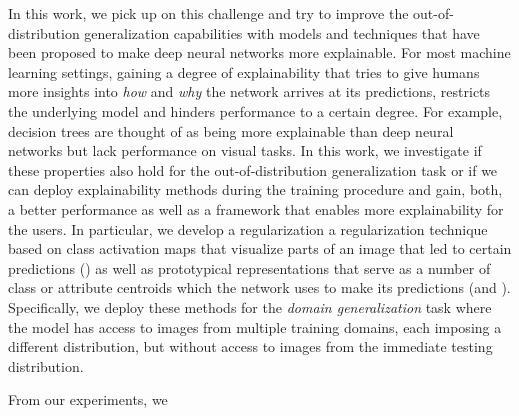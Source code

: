 In this work, we pick up on this challenge and try to improve the out-of-distribution generalization capabilities with models and techniques that have been proposed to make deep neural networks more explainable. For most machine learning settings, gaining a degree of explainability that tries to give humans more insights into \emph{how} and \emph{why} the network arrives at its predictions, restricts the underlying model and hinders performance to a certain degree. For example, decision trees are thought of as being more explainable than deep neural networks but lack performance on visual tasks. In this work, we investigate if these properties also hold for the out-of-distribution generalization task or if we can deploy explainability methods during the training procedure and gain, both, a better performance as well as a framework that enables more explainability for the users. In particular, we develop a regularization a regularization technique based on class activation maps that visualize parts of an image that led to certain predictions (\divcam) as well as prototypical representations that serve as a number of class or attribute centroids which the network uses to make its predictions (\prodrop and \dtransformers). Specifically, we deploy these methods for the \emph{domain generalization} task where the model has access to images from multiple training domains, each imposing a different distribution, but without access to images from the immediate testing distribution.

From our experiments, we 












